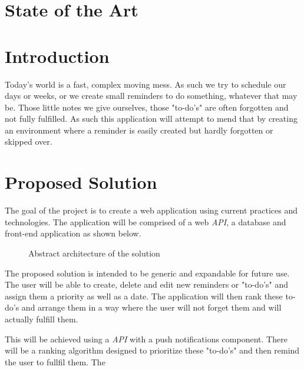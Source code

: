 \documentclass[12pt]{paper}
\begin{document}
	\section{State of the Art}

	\setcounter{page}{2}
	\section{Introduction}
	Today's world is a fast, complex moving mess. As such we try to schedule our days or weeks, or we create small reminders to do something, whatever that may be. Those little notes we give ourselves, those "to-do's" are often forgotten and not fully fulfilled. As such this application will attempt to mend that by creating an environment where a reminder is easily created but hardly forgotten or skipped over.
		
	\section{Proposed Solution}
		The goal of the project is to create a web application using current practices and technologies. The application will be comprised of a web \textit{API}, a database and front-end application as shown below.
		\begin{figure}[!h]
			\centering
			\caption{Abstract architecture of the solution}
		\end{figure}
		\vspace{0.5cm}
		The proposed solution is intended to be generic and expandable for future use.
		The user will be able to create, delete and edit new reminders or "to-do's" and assign them a priority as well as a date. The application will then rank these to-do's and arrange them in a way where the user will not forget them and will actually fulfill them.
		
		This will be achieved using a \textit{\cite{REST}} \textit{API} with a push notifications component. There will be a ranking algorithm designed to prioritize these "to-do's" and then remind the user to fullfil them.
		The 
		
\end{document}
